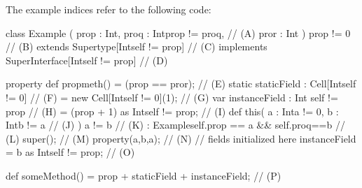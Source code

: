 The example indices refer to the following code:
\begin{xten}
class Example (
   prop : Int,
   proq : Int{prop != proq},                    // (A)
   pror : Int
   )
   {prop != 0}                                  // (B)
   extends Supertype[Int{self != prop}]         // (C)
   implements SuperInterface[Int{self != prop}] // (D)
{
   property def propmeth() = (prop == pror);    // (E)
   static staticField
      : Cell[Int{self != 0}]                    // (F)
      = new Cell[Int{self != 0}](1);            // (G)
   var instanceField
      : Int {self != prop}                      // (H)
      = (prop + 1) as Int{self != prop};        // (I)
   def this(
      a : Int{a != 0},
      b : Int{b != a}                           // (J)
      )
      {a != b}                                  // (K)
      : Example{self.prop == a && self.proq==b} // (L)
   {
      super();                                  // (M)
      property(a,b,a);                          // (N)
      // fields initialized here
      instanceField = b as Int{self != prop};   // (O)
   }

   def someMethod() =
        prop + staticField + instanceField;     // (P)
}
\end{xten}
%
